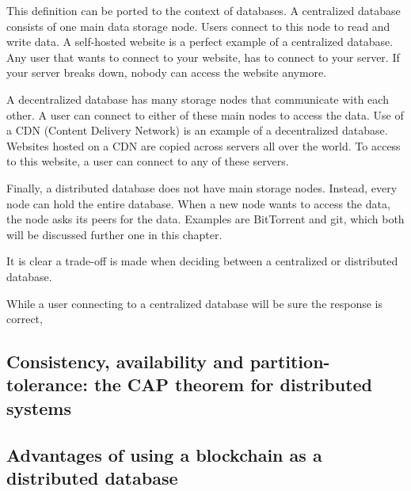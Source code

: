 This definition can be ported to the context of databases. A centralized database consists of one main data storage node. Users connect to this node to read and write data. A self-hosted website is a perfect example of a centralized database. Any user that wants to connect to your website, has to connect to your server. If your server breaks down, nobody can access the website anymore.

A decentralized database has many storage nodes that communicate with each other. A user can connect to either of these main nodes to access the data. Use of a CDN (Content Delivery Network) is an example of a decentralized database. Websites hosted on a CDN are copied across servers all over the world. To access to this website, a user can connect to any of these servers.

Finally, a distributed database does not have main storage nodes. Instead, every node can hold the entire database. When a new node wants to access the data, the node asks its peers for the data. Examples are BitTorrent and git, which both will be discussed further one in this chapter.

It is clear a trade-off is made when deciding between a centralized or distributed database. 

While a user connecting to a centralized database will be sure the response is correct, 

\subsection{Consistency, availability and partition-tolerance: the CAP theorem for distributed systems}



\subsection{Advantages of using a blockchain as a distributed database}

